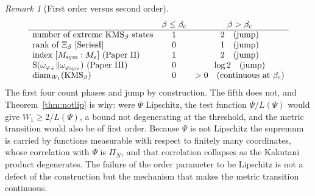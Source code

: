 \documentclass[11pt]{amsart}
\numberwithin{equation}{section}
\theoremstyle{definition}
\theoremstyle{remark}
\newtheorem{remark}[theorem]{Remark}
\newcommand{\Ent}{\mathrm{S}}
\newcommand{\diam}{\operatorname{diam}}
\newcommand{\phisym}{\varphi_{\mathrm{sym}}}
\newcommand{\Msym}{M_{\mathrm{sym}}}
\begin{document}
\begin{remark}[First order versus second order]\label{rem:orders}
\[
\begin{array}{lcc}
& \beta\le\beta_c & \beta>\beta_c\\\hline
\text{number of extreme }\mathrm{KMS}_\beta\text{ states} & 1 & 2\quad(\text{jump})\\
\text{rank of }\Xi_\beta\ \text{\cite{SeriesI}} & 0 & 1\quad(\text{jump})\\
\text{index }[\Msym:M_\varepsilon]\ \text{(Paper II)} & 1 & 2\quad(\text{jump})\\
\Ent(\omega_{\varphi_\pm}\|\omega_{\phisym})\ \text{(Paper III)} & 0 & \log2\quad(\text{jump})\\
\diam_{W_1}(\mathrm{KMS}_\beta) & 0 & >0\quad(\text{continuous at }\beta_c)
\end{array}
\]
The first four count phases and jump by construction. The fifth does not, and
Theorem~\ref{thm:notlip} is why: were $\Psi$ Lipschitz, the test function $\Psi/L(\Psi)$
would give $W_1\ge2/L(\Psi)$, a bound not degenerating at the threshold, and the metric
transition would also be of first order. Because $\Psi$ is not Lipschitz the supremum is
carried by functions measurable with respect to finitely many coordinates, whose correlation
with $\Psi$ is $\Pi_N$, and that correlation collapses as the Kakutani product degenerates.
The failure of the order parameter to be Lipschitz is not a defect of the construction but
the mechanism that makes the metric transition continuous.
\end{remark}
\end{document}
